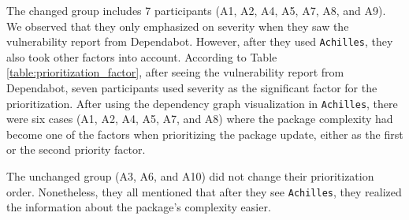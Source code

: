 \documentclass[conference]{IEEEtran}
\begin{document}
	The changed group includes 7 participants (A1, A2, A4, A5, A7, A8, and A9). We observed that they only emphasized on severity when they saw the vulnerability report from Dependabot. However, after they used \texttt{Achilles}, they also took other factors into account. 
	According to Table \ref{table:prioritization_factor}, after seeing the vulnerability report from Dependabot, seven participants used severity as the significant factor for the prioritization. After using the dependency graph visualization in \texttt{Achilles}, there were six cases (A1, A2, A4, A5, A7, and A8) where the package complexity had become one of the factors when prioritizing the package update, either as the first or the second priority factor.
	
	The unchanged group (A3, A6, and A10) did not change their prioritization order. Nonetheless, they all mentioned that after they see \texttt{Achilles}, they realized the information about the package's complexity easier.
	
\end{document}
